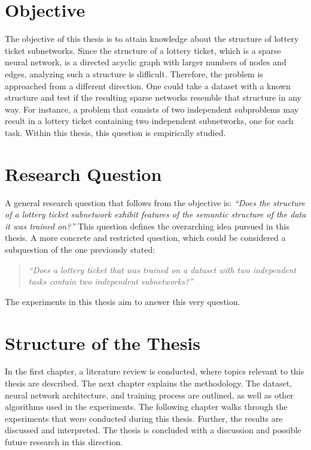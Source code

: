 \section{Objective}
The objective of this thesis is to attain knowledge about the structure of lottery ticket subnetworks.
Since the structure of a lottery ticket, which is a sparse neural network, is a directed acyclic graph with larger numbers of nodes and edges, analyzing such a structure is difficult.
Therefore, the problem is approached from a different direction.
One could take a dataset with a known structure and test if the resulting sparse networks resemble that structure in any way.
For instance, a problem that consists of two independent subproblems may result in a lottery ticket containing two independent subnetworks, one for each task. 
Within this thesis, this question is empirically studied.

\section{Research Question}
A general research question that follows from the objective is: \textit{``Does the structure of a lottery ticket subnetwork exhibit features of the semantic structure of the data it was trained on?''}
This question defines the overarching idea pursued in this thesis.
A more concrete and restricted question, which could be considered a subquestion of the one previously stated:

\begin{quote}
\textit{``Does a lottery ticket that was trained on a dataset with two independent tasks contain two independent subnetworks?''}
\end{quote}

The experiments in this thesis aim to answer this very question.

\section{Structure of the Thesis}
In the first chapter, a literature review is conducted, where topics relevant to this thesis are described.
The next chapter explains the methodology.
The dataset, neural network architecture, and training process are outlined, as well as other algorithms used in the experiments.
The following chapter walks through the experiments that were conducted during this thesis.
Further, the results are discussed and interpreted.
The thesis is concluded with a discussion and possible future research in this direction.